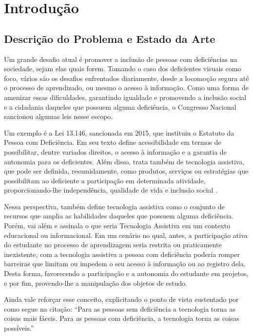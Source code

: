 \chapter{Introdução}

\section{Descrição do Problema e Estado da Arte}

Um grande desafio atual é promover a inclusão de pessoas com deficiências na sociedade, sejam elas quais forem. Tomando o caso dos deficientes visuais como foco, vários são os desafios enfrentados diariamente, desde a locomoção segura até o processo de aprendizado, ou mesmo o acesso à informação. Como uma forma de amenizar essas dificuldades, garantindo igualdade e promovendo a inclusão social e a cidadania daqueles que possuem alguma deficiência, o Congresso Nacional sancionou algumas leis nesse escopo.

Um exemplo é a Lei 13.146, sancionada em 2015, que instituiu o Estatuto da Pessoa com Deficiência. Em seu texto define acessibilidade em termos de possibilitar, dentre variados direitos, o acesso à informação e a garantia de autonomia para os deficientes. Além disso, trata também de tecnologia assistiva, que pode ser definida, resumidamente, como produtos, serviços ou estratégias que possibilitam ao deficiente a participação em determinada atividade, proporcionando-lhe independência, qualidade de vida e inclusão social .

Nessa perspectiva,  também define tecnologia assistiva como o conjunto de recursos que amplia as habilidades daqueles que possuem alguma deficiência. Porém,  vai além e assinala o que seria Tecnologia Assistiva em um contexto educacional ou informacional. Em um cenário no qual, antes, a participação ativa do estudante no processo de aprendizagem seria restrita ou praticamente inexistente, com a tecnologia assistiva a pessoa com deficiência poderia romper barreiras que limitam ou impedem o seu acesso à informação ou ao registro dela. Desta forma, favorecendo a participação e a autonomia do estudante em projetos, e por fim, provendo-lhe a manipulação dos objetos de estudo.

Ainda vale reforçar esse conceito, explicitando o ponto de vista sustentado por  como segue na citação: ``Para as pessoas sem deficiência a tecnologia torna as coisas mais fáceis. Para as pessoas com deficiência, a tecnologia torna as coisas possíveis.''


